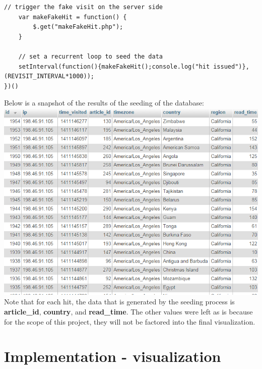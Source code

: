 \documentclass[12pt]{article}
\begin{document}
\begin{enumerate}
\begin{lstlisting}[basicstyle=\scriptsize]
	// trigger the fake visit on the server side
	var makeFakeHit = function() {
		$.get("makeFakeHit.php");
	}
	
	// set a recurrent loop to seed the data
	setInterval(function(){makeFakeHit();console.log("hit issued")},(REVISIT_INTERVAL*1000));
})()
\end{lstlisting}
\end{enumerate}

\noindent Below is a snapshot of the results of the seeding of the database: \\

\noindent\includegraphics[scale=0.8]{img/seeder_mock_hits} \\

\noindent Note that for each hit, the data that is generated by the seeding process is \textbf{article\_id}, \textbf{country}, and \textbf{read\_time}. The other values were left as is because for the scope of this project, they will not be factored into the final visualization. 

\vfill

\section{Implementation - visualization}

\vfill
\end{document}
